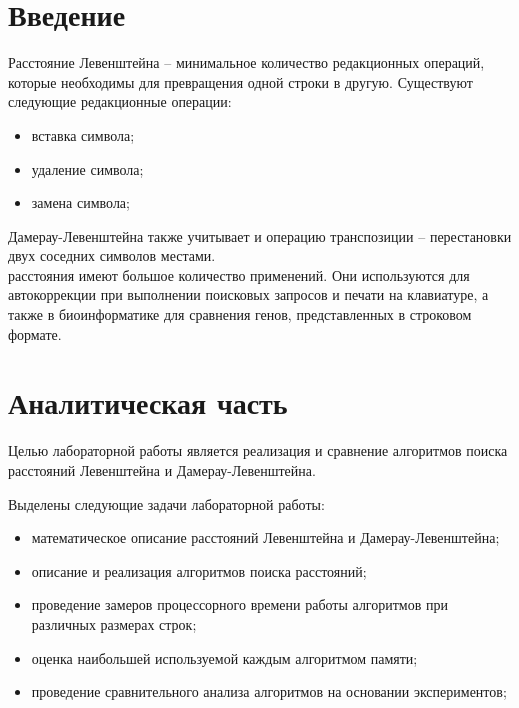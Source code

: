 \documentclass[10pt,a4paper]{report}
\begin{document}
	
	
	
	\tableofcontents
	\newpage

	\chapter*{Введение}
	Расстояние Левенштейна – минимальное количество редакционных операций, которые необходимы для превращения одной строки в другую. Существуют следующие редакционные операции:
	\begin{itemize}
	\item вставка символа;
	\item удаление символа;
	\item замена символа;
	\end{itemize}

	 Дамерау-Левенштейна также учитывает и операцию транспозиции – перестановки двух соседних символов местами.\\
	 расстояния имеют большое количество применений. Они используются для автокоррекции при выполнении поисковых запросов и печати на клавиатуре, а также в биоинформатике для сравнения генов, представленных в строковом формате.
	
	\newpage
	\chapter{Аналитическая часть}
	Целью лабораторной работы является реализация и сравнение алгоритмов поиска расстояний Левенштейна и Дамерау-Левенштейна.
	
	Выделены следующие задачи лабораторной работы:
	
	\begin{itemize}
	\item математическое описание расстояний Левенштейна 
	и Дамерау-Левенштейна;
	\item описание и реализация алгоритмов поиска расстояний;
	\item проведение замеров процессорного времени работы алгоритмов при различных размерах строк;
	\item оценка наибольшей используемой каждым алгоритмом памяти;
	\item проведение сравнительного анализа алгоритмов на основании экспериментов;
	\end{itemize}
\end{document}
